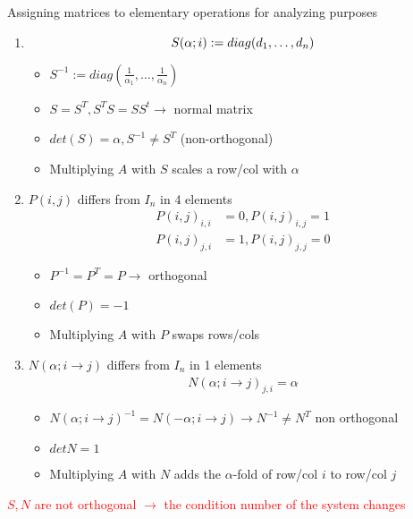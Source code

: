 \begin{definition}
	Assigning matrices to elementary operations for analyzing purposes
	\begin{enumerate}[noitemsep]
		\item \begin{multicols}{2}
			\begin{equation*}
				S(\alpha;i) := diag(d_1, \dots, d_n)
			\end{equation*}
			\begin{itemize}[noitemsep]
				\item $S^{-1} := diag(\frac{1}{\alpha_1}, \dots, \frac{1}{\alpha_n})$
				\item $S=S^T, S^TS = SS^t \rightarrow $ normal matrix
				\item $det(S) = \alpha, S^{-1} \neq S^T$ (non-orthogonal)
				\item Multiplying $A$ with $S$ scales a row/col with $\alpha$
			\end{itemize}
		\end{multicols}
		\item \begin{multicols}{2}
			$P(i, j)$ differs from $I_n$ in 4 elements \begin{align*}
			P(i, j)_{i, i} &= 0, P(i, j)_{i, j} = 1 \\
			P(i, j)_{j, i} &= 1, P(i, j)_{j, j} = 0 			
			\end{align*}
			\begin{itemize}[noitemsep]
				\item $P^{-1} = P^T = P \rightarrow $ orthogonal
				\item $det (P) = -1$
				\item Multiplying $A$ with $P$ swaps rows/cols
			\end{itemize}
		\end{multicols}
		\item \begin{multicols}{2}
			$N(\alpha; i \rightarrow j)$ differs from $I_n$ in 1 elements \begin{align*}
			N(\alpha; i \rightarrow j)_{j, i} = \alpha			
			\end{align*}
			\begin{itemize}[noitemsep]
				\item $N(\alpha; i \rightarrow j)^{-1} = N(-\alpha; i \rightarrow j) \rightarrow N^{-1} \neq N^T $ non orthogonal
				\item $det N = 1$
				\item Multiplying $A$ with $N$ adds the $\alpha$-fold of row/col $i$ to row/col $j$
			\end{itemize}
		\end{multicols}
	\end{enumerate}

	\textcolor{red}{$S, N$ are not orthogonal $\rightarrow$ the condition number of the system changes}
\end{definition}


